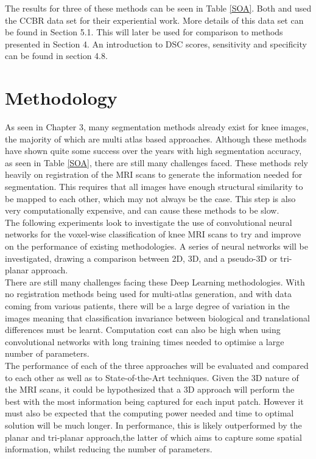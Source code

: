 \documentclass[11pt,a4paper]{memoir}
\numberwithin{figure}{section}
\numberwithin{table}{section}
\numberwithin{equation}{section}
\begin{document}
The results for three of these methods can be seen in Table \ref{SOA}. Both \cite{Dam2015} and \cite{Prasoon2013DeepNetwork} used the CCBR data set for their experiential work. More details of this data set can be found in Section 5.1.  This will later be used for comparison to methods presented in Section 4. An introduction to DSC scores, sensitivity and specificity can be found in section 4.8. 


\chapter{Methodology}

As seen in Chapter 3, many segmentation methods already exist for knee images, the majority of which are multi atlas based approaches. Although these methods have shown quite some success over the years with high segmentation accuracy, as seen in Table \ref{SOA}, there are still many challenges faced. These methods rely heavily on registration of the MRI scans to generate the information needed for segmentation. This requires that all images have enough structural similarity to be mapped to each other, which may not always be the case. This step is also very computationally expensive, and can cause these methods to be slow. \\

The following experiments look to investigate the use of convolutional neural networks for the voxel-wise classification of knee MRI scans to try and improve on the performance of existing methodologies. A series of neural networks will be investigated, drawing a comparison between 2D, 3D, and a pseudo-3D or tri-planar approach. \\

There are still many challenges facing these Deep Learning methodologies. With no registration methods being used for multi-atlas generation, and with data coming from various patients, there will be a large degree of variation in the images meaning that classification invariance between biological and translational differences must be learnt. Computation cost can also be high when using convolutional networks with long training times needed to optimise a large number of parameters. \\

The performance of each of the three approaches will be evaluated and compared to each other as well as to State-of-the-Art techniques. Given the 3D nature of the MRI scans, it could be hypothesized that a 3D approach will perform the best with the most information being captured for each input patch. However it must also be expected that the computing power needed and time to optimal solution will be much longer. In performance, this is likely outperformed by the planar and tri-planar approach,the latter of which aims to capture some spatial information, whilst reducing the number of parameters. 
\end{document}
